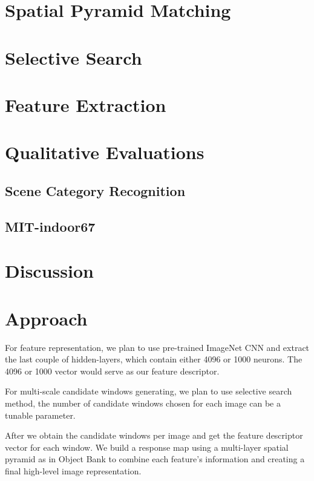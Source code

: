 \documentclass[letterpaper,twocolumn,10pt]{article}
\begin{document}
\section{Spatial Pyramid Matching}

\section{Selective Search}

\section{Feature Extraction}

\section{Qualitative Evaluations}

\subsection{Scene Category Recognition}

\subsection{MIT-indoor67}

\section{Discussion}

\iffalse

\section{Approach}
\par
    For feature representation, we plan to use pre-trained ImageNet CNN and
    extract the last couple of hidden-layers, which contain either 4096 or
    1000 neurons. The 4096 or 1000 vector would serve as our feature
    descriptor.

\par
    For multi-scale candidate windows generating, we plan to use selective
    search method, the number of candidate windows chosen for each image can be
    a tunable parameter.

\par
    After we obtain the candidate windows per image and get the feature
    descriptor vector for each window. We build a response map using
    a multi-layer spatial pyramid as in Object Bank to combine each feature's
    information and creating a final high-level image representation.
\end{document}
